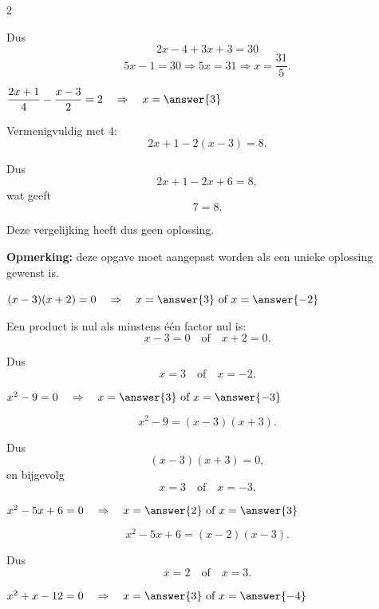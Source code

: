 \documentclass{ximera}
\begin{document}
\begin{oefening}[Vergelijkingen]{\oefB\ESS}
\begin{multicols}{2}
\begin{question}
\begin{oplossing}
Dus
\[
2x-4+3x+3=30
\]
\[
5x-1=30
\Rightarrow5x=31
\Rightarrow x=\dfrac{31}{5}.
\]
\end{oplossing}
\end{question}


\begin{question}
$\dfrac{2x+1}{4}-\dfrac{x-3}{2}=2
\quad\Rightarrow\quad
x=\answer{3}$

\begin{oplossing}
Vermenigvuldig met $4$:
\[
2x+1-2(x-3)=8.
\]

Dus
\[
2x+1-2x+6=8,
\]
wat geeft
\[
7=8.
\]

Deze vergelijking heeft dus geen oplossing.

\textbf{Opmerking:} deze opgave moet aangepast worden als een unieke oplossing gewenst is.
\end{oplossing}
\end{question}


\begin{question}
$(x-3)(x+2)=0
\quad\Rightarrow\quad
x=\answer{3}\ \text{of}\ x=\answer{-2}$

\begin{oplossing}
Een product is nul als minstens één factor nul is:
\[
x-3=0
\quad\text{of}\quad
x+2=0.
\]

Dus
\[
x=3
\quad\text{of}\quad
x=-2.
\]
\end{oplossing}
\end{question}


\begin{question}
$x^2-9=0
\quad\Rightarrow\quad
x=\answer{3}\ \text{of}\ x=\answer{-3}$

\begin{oplossing}
\[
x^2-9
=(x-3)(x+3).
\]

Dus
\[
(x-3)(x+3)=0,
\]
en bijgevolg
\[
x=3
\quad\text{of}\quad
x=-3.
\]
\end{oplossing}
\end{question}


\begin{question}
$x^2-5x+6=0
\quad\Rightarrow\quad
x=\answer{2}\ \text{of}\ x=\answer{3}$

\begin{oplossing}
\[
x^2-5x+6
=(x-2)(x-3).
\]

Dus
\[
x=2
\quad\text{of}\quad
x=3.
\]
\end{oplossing}
\end{question}


\begin{question}
$x^2+x-12=0
\quad\Rightarrow\quad
x=\answer{3}\ \text{of}\ x=\answer{-4}$


\end{question}
\end{multicols}
\end{oefening}
\end{document}
